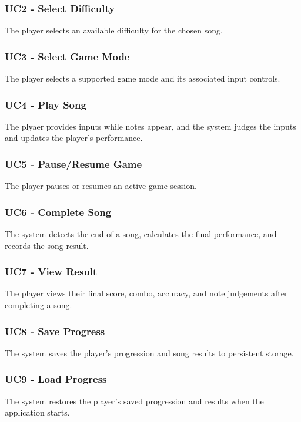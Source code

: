 \documentclass[12pt,a4paper]{article}
\begin{document}
            \subsubsection{UC2 - Select Difficulty}
                The player selects an available difficulty for the chosen song.

            \subsubsection{UC3 - Select Game Mode}
                The player selects a supported game mode and its associated input controls.

            \subsubsection{UC4 - Play Song}
                The plyaer provides inputs while notes appear, and the system judges the inputs and updates the player's performance.

            \subsubsection{UC5 - Pause/Resume Game}
                The player pauses or resumes an active game session.

            \subsubsection{UC6 - Complete Song}
                The system detects the end of a song, calculates the final performance, and records the song result.

            \subsubsection{UC7 - View Result}
                The player views their final score, combo, accuracy, and note judgements after completing a song.

            \subsubsection{UC8 - Save Progress}
                The system saves the player's progression and song results to persistent storage.

            \subsubsection{UC9 - Load Progress}
                The system restores the player's saved progression and results when the application starts.
\end{document}
